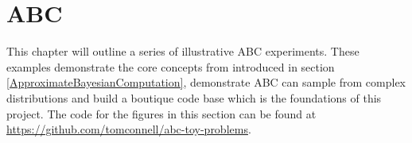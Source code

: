 \chapter{ABC}

This chapter will outline a series of illustrative ABC experiments. These examples demonstrate the core concepts from introduced in section \ref{ApproximateBayesianComputation}, demonstrate ABC can sample from complex distributions and build a boutique code base which is the foundations of this project. The code for the figures in this section can be found at \url{https://github.com/tomconnell/abc-toy-problems}.




